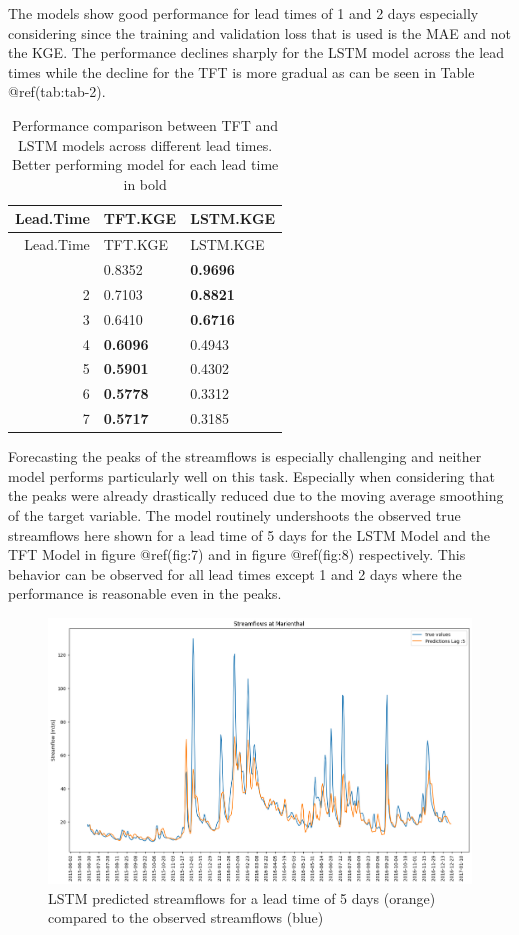 \documentclass[
]{article}
\begin{document}
The models show good performance for lead times of 1 and 2 days
especially considering since the training and validation loss that is
used is the MAE and not the KGE. The performance declines sharply for
the LSTM model across the lead times while the decline for the TFT is
more gradual as can be seen in Table @ref(tab:tab-2).

\begin{longtable}[]{@{}rll@{}}
\caption{Performance comparison between TFT and LSTM models across
different lead times. Better performing model for each lead time in
bold}\tabularnewline
\toprule\noalign{}
Lead.Time & TFT.KGE & LSTM.KGE \\
\midrule\noalign{}
\endfirsthead
\toprule\noalign{}
Lead.Time & TFT.KGE & LSTM.KGE \\
\midrule\noalign{}
\endhead
\bottomrule\noalign{}
\endlastfoot
1 & 0.8352 & \textbf{0.9696} \\
2 & 0.7103 & \textbf{0.8821} \\
3 & 0.6410 & \textbf{0.6716} \\
4 & \textbf{0.6096} & 0.4943 \\
5 & \textbf{0.5901} & 0.4302 \\
6 & \textbf{0.5778} & 0.3312 \\
7 & \textbf{0.5717} & 0.3185 \\
\end{longtable}

Forecasting the peaks of the streamflows is especially challenging and
neither model performs particularly well on this task. Especially when
considering that the peaks were already drastically reduced due to the
moving average smoothing of the target variable. The model routinely
undershoots the observed true streamflows here shown for a lead time of
5 days for the LSTM Model and the TFT Model in figure @ref(fig:7) and in
figure @ref(fig:8) respectively. This behavior can be observed for all
lead times except 1 and 2 days where the performance is reasonable even
in the peaks.

\begin{figure}

{\centering \includegraphics[width=500px]{work/07-hydroLSTM/images/lag5_lstm} 

}

\caption{LSTM predicted streamflows for a lead time of 5 days (orange) compared to the observed streamflows (blue)}\label{fig:7}
\end{figure}
\end{document}
